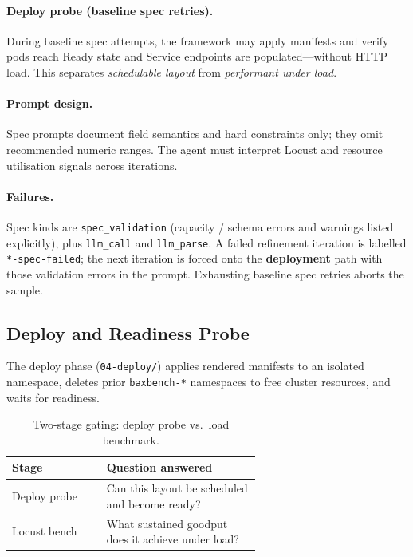 \paragraph{Deploy probe (baseline spec retries).}
During baseline spec attempts, the framework may apply manifests and verify pods
reach Ready state and Service endpoints are populated---without HTTP load.
This separates \emph{schedulable layout} from \emph{performant under load}.

\paragraph{Prompt design.}
Spec prompts document field semantics and hard constraints only; they omit
recommended numeric ranges.  The agent must interpret Locust and resource
utilisation signals across iterations.

\paragraph{Failures.}
Spec kinds are \texttt{spec\_validation} (capacity / schema errors and
warnings listed explicitly), plus \texttt{llm\_call} and \texttt{llm\_parse}.
A failed refinement iteration is labelled \texttt{*-spec-failed}; the next
iteration is forced onto the \textbf{deployment} path with those validation
errors in the prompt.  Exhausting baseline spec retries aborts the sample.


\subsection{Deploy and Readiness Probe}
\label{sec:methods-deploy}

The deploy phase (\texttt{04-deploy/}) applies rendered manifests to an
isolated namespace, deletes prior \texttt{baxbench-*} namespaces to free
cluster resources, and waits for readiness.

\begin{table}[t]
  \centering
  \caption{Two-stage gating: deploy probe vs.\ load benchmark.}
  \label{tab:deploy-vs-bench}
  \small
  \begin{tabular}{@{}lp{0.62\linewidth}@{}}
    \toprule
    \textbf{Stage} & \textbf{Question answered} \\
    \midrule
    Deploy probe & Can this layout be scheduled and become ready? \\
    Locust bench & What sustained goodput does it achieve under load? \\
    \bottomrule
  \end{tabular}
\end{table}

